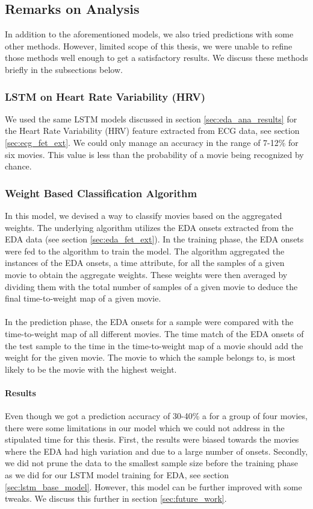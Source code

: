\subsection{Remarks on Analysis}
In addition to the aforementioned models, we also tried predictions with some other methods. However, limited scope of this thesis, we were unable to refine those methods well enough to get a satisfactory results. We discuss these methods briefly in the subsections below.
\subsubsection{LSTM on Heart Rate Variability (HRV)} We used the same LSTM models discussed in section \ref{sec:eda_ana_results} for the Heart Rate Variability (HRV) feature extracted from ECG data, see section \ref{sec:ecg_fet_ext}. We could only manage an accuracy in the range of 7-12\% for six movies. This value is less than the probability of a movie being recognized by chance.

\subsubsection{Weight Based Classification Algorithm} In this model, we devised a way to classify movies based on the aggregated weights. The underlying algorithm utilizes the EDA onsets extracted from the EDA data (see section \ref{sec:eda_fet_ext}). In the training phase, the EDA onsets were fed to the algorithm to train the model. The algorithm aggregated the instances of the EDA onsets, a time attribute, for all the samples of a given movie to obtain the aggregate weights. These weights were then averaged by dividing them with the total number of samples of a given movie to deduce the final time-to-weight map of a given movie.

\paragraph{} In the prediction phase, the EDA onsets for a sample were compared with the time-to-weight map of all different movies. The time match of the EDA onsets of the test sample to the time in the time-to-weight map of a movie should add the weight for the given movie. The movie to which the sample belongs to, is most likely to be the movie with the highest weight.
\paragraph{Results} Even though we got a prediction accuracy of 30-40\% a for a group of four movies, there were some limitations in our model which we could not address in the stipulated time for this thesis. First, the results were biased towards the movies where the EDA had high variation and due to a large number of onsets. Secondly, we did not prune the data to the smallest sample size before the training phase as we did for our LSTM model training for EDA, see section \ref{sec:lstm_base_model}. However, this model can be further improved with some tweaks. We discuss this further in section \ref{sec:future_work}.

